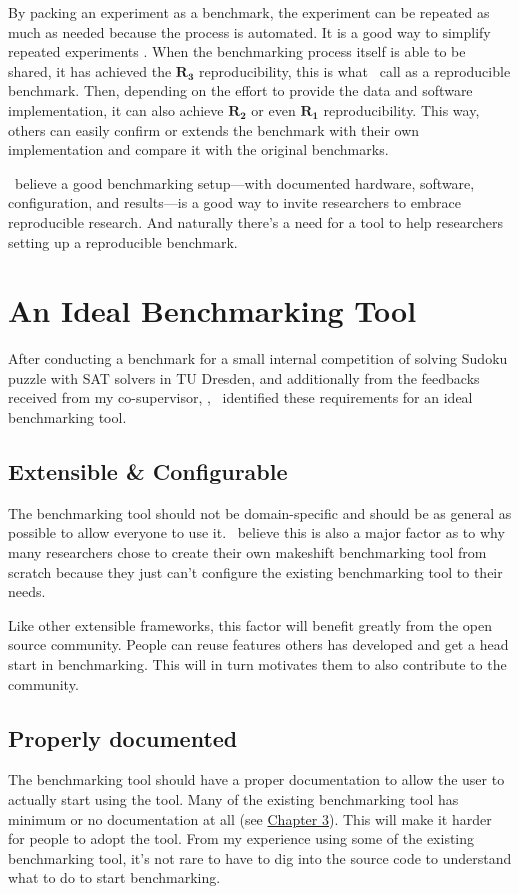 By packing an experiment as a benchmark, the experiment can be repeated as much as needed because the process is automated.
It is a good way to simplify repeated experiments \citep{tichyShouldComputerScientists1998}.
When the benchmarking process itself is able to be shared, it has achieved the $\bm{R_3}$ reproducibility, this is what \I~call as a reproducible benchmark.
Then, depending on the effort to provide the data and software implementation, it can also achieve $\bm{R_2}$ or even $\bm{R_1}$ reproducibility.
This way, others can easily confirm or extends the benchmark with their own implementation and compare it with the original benchmarks.

\I~believe a good benchmarking setup---with documented hardware, software, configuration, and results---is a good way to invite researchers to embrace reproducible research. And naturally there's a need for a tool to help researchers setting up a reproducible benchmark.


\section{An Ideal Benchmarking Tool}
\label{sec:idealBenchmarkingTool}

After conducting a benchmark for a small internal competition of solving Sudoku puzzle with SAT solvers in TU Dresden, and additionally from the feedbacks received from my co-supervisor, \pembimbingDua, \I~identified these requirements for an ideal benchmarking tool.

\subsection{Extensible \& Configurable}
The benchmarking tool should not be domain-specific and should be as general as possible to allow everyone to use it.
\I~believe this is also a major factor as to why many researchers chose to create their own makeshift benchmarking tool from scratch because they just can't configure the existing benchmarking tool to their needs.

Like other extensible frameworks, this factor will benefit greatly from the open source community. People can reuse features others has developed and get a head start in benchmarking. This will in turn motivates them to also contribute to the community.

\subsection{Properly documented}
The benchmarking tool should have a proper documentation to allow the user to actually start using the tool.
Many of the existing benchmarking tool has minimum or no documentation at all (see \hyperref[ch:priorWorks]{Chapter 3}).
This will make it harder for people to adopt the tool.
From my experience using some of the existing benchmarking tool, it's not rare to have to dig into the source code to understand what to do to start benchmarking.

